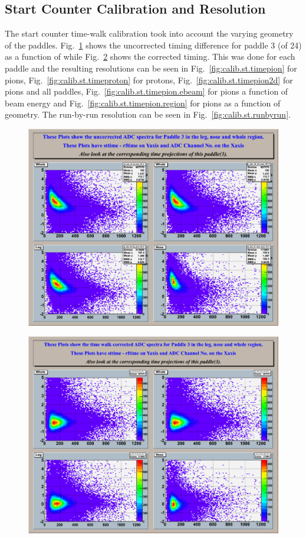 \subsection{\label{sec:calib.st}Start Counter Calibration and Resolution}

The start counter time-walk calibration took into account the varying geometry of the paddles. Fig.~\ref{fig:calib.st.adcuncor} shows the uncorrected timing difference for paddle 3 (of 24) as a function of  while Fig.~\ref{fig:calib.st.adccor} shows the corrected timing. This was done for each paddle and the resulting resolutions can be seen in Fig.~\ref{fig:calib.st.timepion} for pions, Fig.~\ref{fig:calib.st.timeproton} for protons, Fig.~\ref{fig:calib.st.timepion2d} for pions and all paddles, Fig.~\ref{fig:calib.st.timepion.ebeam} for pions a function of beam energy and Fig.~\ref{fig:calib.st.timepion.region} for pions as a function of geometry. The run-by-run resolution can be seen in Fig.~\ref{fig:calib.st.runbyrun}.

\begin{figure}[htbp]\begin{center}
\includegraphics[width=0.65\columnwidth]{figures/calib/st/Uncorrected_adc.eps}
\caption[]{\label{fig:calib.st.adcuncor}}
\end{center}\end{figure}

\begin{figure}[htbp]\begin{center}
\includegraphics[width=0.65\columnwidth]{figures/calib/st/Corrected_adc.eps}
\caption[]{\label{fig:calib.st.adccor}}
\end{center}\end{figure}

